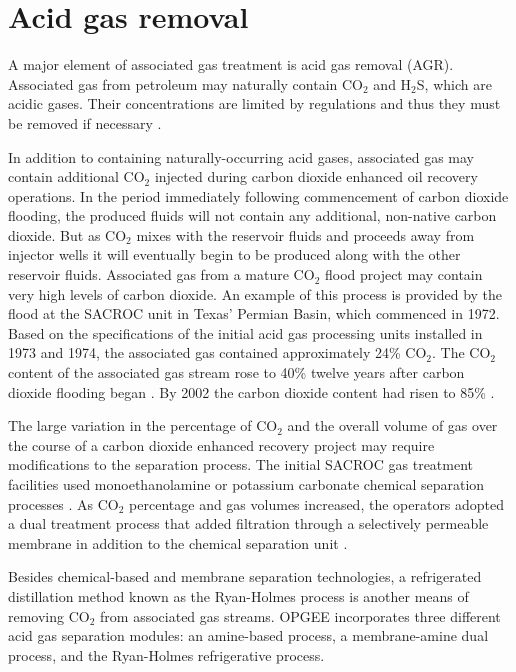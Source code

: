 \documentclass[11pt]{report}
\begin{document}
\clearpage

\section{Acid gas removal}
\label{sec:AGR}

A major element of associated gas treatment is acid gas removal (AGR). Associated gas from petroleum may naturally contain CO$_{2}$ and H$_{2}$S, which are acidic gases. Their concentrations are limited by regulations and thus they must be removed if necessary \cite[p. 211-213]{FundNatGasProcessing}.



In addition to containing naturally-occurring acid gases, associated gas may contain additional CO$_{2}$ injected during carbon dioxide enhanced oil recovery operations. In the period immediately following commencement of carbon dioxide flooding, the produced fluids will not contain any additional, non-native carbon dioxide. But as CO$_{2}$ mixes with the reservoir fluids and proceeds away from injector wells it will eventually begin to be produced along with the other reservoir fluids. Associated gas from a mature CO$_{2}$ flood project may contain very high levels of carbon dioxide. An example of this process is provided by the flood at the SACROC unit in Texas' Permian Basin, which commenced in 1972. Based on the specifications of the initial acid gas processing units installed in 1973 and 1974, the associated gas contained approximately 24\% CO$_{2}$. The CO$_{2}$ content of the associated gas stream rose to 40\% twelve years after carbon dioxide flooding began \cite{Parro1984}. By 2002 the carbon dioxide content had risen to 85\% \cite{Guntis2002}.

The large variation in the percentage of CO$_{2}$ and the overall volume of gas over the course of a carbon dioxide enhanced recovery project may require modifications to the separation process. The initial SACROC gas treatment facilities used monoethanolamine or potassium carbonate chemical separation processes \cite{Guntis2002}. As CO$_{2}$ percentage and gas volumes increased, the operators adopted a dual treatment process that added filtration through a selectively permeable membrane in addition to the chemical separation unit \cite{Parro1984}.

Besides chemical-based and membrane separation technologies, a refrigerated distillation method known as the Ryan-Holmes process is another means of removing CO$_{2}$ from associated gas streams. OPGEE incorporates three different acid gas separation modules: an amine-based process, a membrane-amine dual process, and the Ryan-Holmes refrigerative process. 
\end{document}
